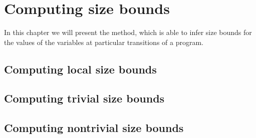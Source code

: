 \section{Computing size bounds}

In this chapter we will present the method, which is able to infer size bounds for the values of the variables at particular transitions of a program.

\subsection{Computing local size bounds}



\subsection{Computing trivial size bounds}



\subsection{Computing nontrivial size bounds}


